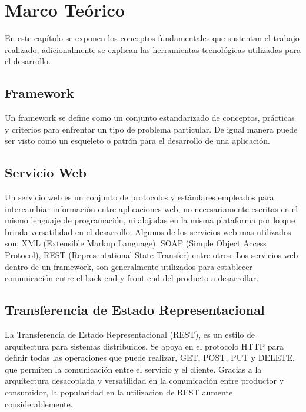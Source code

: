 \chapter{Marco Teórico} \label{chap:Marco Teorico}

\vspace{5 mm}

	En este capítulo se exponen los conceptos fundamentales que sustentan el trabajo realizado, adicionalmente se explican las herramientas tecnológicas utilizadas para el desarrollo.
	
\section{Framework} \label{sect:Framework}
Un framework se define como un conjunto estandarizado de conceptos, prácticas
y criterios para enfrentar un tipo de problema particular. De igual manera
puede ser visto como un esqueleto o patrón para el desarrollo de una aplicación.\cite{FW}

\section{Servicio Web} \label{sect:Servicio Web}
Un servicio web es un conjunto de protocolos y estándares empleados para
intercambiar información entre aplicaciones web, no necesariamente escritas
en el mismo lenguaje de programación, ni alojadas en la misma plataforma
por lo que brinda versatilidad en el desarrollo. Algunos de los servicios web
mas utilizados son: XML (Extensible Markup Language), SOAP (Simple Object Access Protocol), REST (Representational State Transfer) entre otros. Los servicios web dentro de un framework, son generalmente utilizados para establecer comunicación entre el back-end y front-end del producto a desarrollar.\cite{SW}

\section{Transferencia de Estado Representacional} \label{sect:REST}
La Transferencia de Estado Representacional (REST), es un estilo de arquitectura
para sistemas distribuidos. Se apoya en el protocolo HTTP para definir
todas las operaciones que puede realizar, GET, POST, PUT y DELETE, que permiten
la comunicación entre el servicio y el cliente. Gracias a la arquitectura
desacoplada y versatilidad en la comunicación entre productor y consumidor,
la popularidad en la utilizacion de REST aumente considerablemente.\cite{REST}

